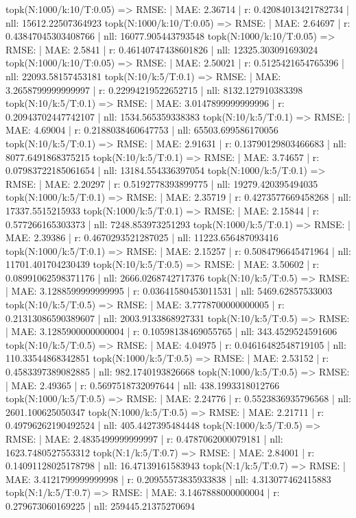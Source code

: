 topk(N:1000/k:10/T:0.05) => RMSE: | MAE: 2.36714 | r: 0.42084013421782734 | nll: 15612.22507364923
topk(N:1000/k:10/T:0.05) => RMSE: | MAE: 2.64697 | r: 0.43847045303408766 | nll: 16077.905443793548
topk(N:1000/k:10/T:0.05) => RMSE: | MAE: 2.5841 | r: 0.46140747438601826 | nll: 12325.303091693024
topk(N:1000/k:10/T:0.05) => RMSE: | MAE: 2.50021 | r: 0.5125421654765396 | nll: 22093.58157453181
topk(N:10/k:5/T:0.1) => RMSE: | MAE: 3.2658799999999997 | r: 0.22994219522652715 | nll: 8132.127910383398
topk(N:10/k:5/T:0.1) => RMSE: | MAE: 3.0147899999999996 | r: 0.20943702447742107 | nll: 1534.565359338383
topk(N:10/k:5/T:0.1) => RMSE: | MAE: 4.69004 | r: 0.2188038460647753 | nll: 65503.699586170056
topk(N:10/k:5/T:0.1) => RMSE: | MAE: 2.91631 | r: 0.13790129803466683 | nll: 8077.6491868375215
topk(N:10/k:5/T:0.1) => RMSE: | MAE: 3.74657 | r: 0.07983722185061654 | nll: 13184.554336397054
topk(N:1000/k:5/T:0.1) => RMSE: | MAE: 2.20297 | r: 0.5192778393899775 | nll: 19279.420395494035
topk(N:1000/k:5/T:0.1) => RMSE: | MAE: 2.35719 | r: 0.4273577669458268 | nll: 17337.5515215933
topk(N:1000/k:5/T:0.1) => RMSE: | MAE: 2.15844 | r: 0.577266165303373 | nll: 7248.853973251293
topk(N:1000/k:5/T:0.1) => RMSE: | MAE: 2.39386 | r: 0.4670293521287025 | nll: 11223.656487093416
topk(N:1000/k:5/T:0.1) => RMSE: | MAE: 2.15257 | r: 0.5084796645471964 | nll: 11701.401704230439
topk(N:10/k:5/T:0.5) => RMSE: | MAE: 3.50602 | r: 0.08991062598371176 | nll: 2666.0268742717376
topk(N:10/k:5/T:0.5) => RMSE: | MAE: 3.1288599999999995 | r: 0.03641580453011531 | nll: 5469.62857533003
topk(N:10/k:5/T:0.5) => RMSE: | MAE: 3.7778700000000005 | r: 0.21313086590389607 | nll: 2003.9133868927331
topk(N:10/k:5/T:0.5) => RMSE: | MAE: 3.1285900000000004 | r: 0.10598138469055765 | nll: 343.4529524591606
topk(N:10/k:5/T:0.5) => RMSE: | MAE: 4.04975 | r: 0.04616482548719105 | nll: 110.33544868342851
topk(N:1000/k:5/T:0.5) => RMSE: | MAE: 2.53152 | r: 0.4583397389082885 | nll: 982.1740193826668
topk(N:1000/k:5/T:0.5) => RMSE: | MAE: 2.49365 | r: 0.5697518732097644 | nll: 438.1993318012766
topk(N:1000/k:5/T:0.5) => RMSE: | MAE: 2.24776 | r: 0.5523836935796568 | nll: 2601.100625050347
topk(N:1000/k:5/T:0.5) => RMSE: | MAE: 2.21711 | r: 0.49796262190492524 | nll: 405.4427395484448
topk(N:1000/k:5/T:0.5) => RMSE: | MAE: 2.4835499999999997 | r: 0.4787062000079181 | nll: 1623.7480527553312
topk(N:1/k:5/T:0.7) => RMSE: | MAE: 2.84001 | r: 0.14091128025178798 | nll: 16.47139161583943
topk(N:1/k:5/T:0.7) => RMSE: | MAE: 3.4121799999999998 | r: 0.20955573835933838 | nll: 4.313077462415883
topk(N:1/k:5/T:0.7) => RMSE: | MAE: 3.1467888000000004 | r: 0.279673060169225 | nll: 259445.21375270694
